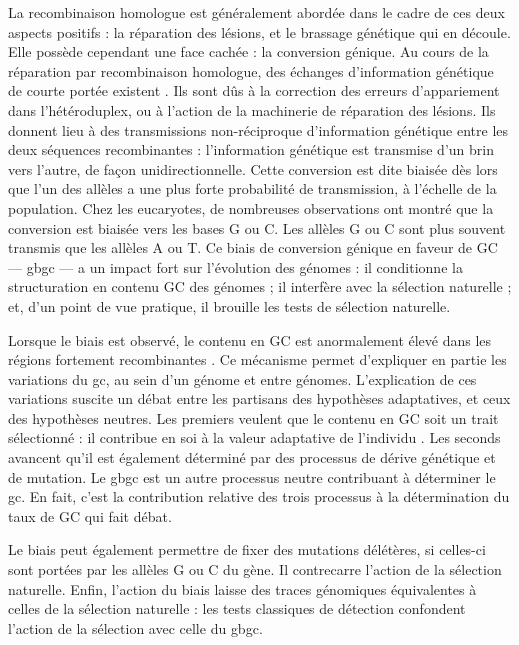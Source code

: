 \documentclass[11pt, oneside]{scrartcl}
\begin{document}
La recombinaison homologue est généralement abordée dans le cadre de ces deux
aspects positifs : la réparation des lésions, et le brassage génétique qui en
découle. Elle possède cependant une face cachée : la conversion génique. Au
cours de la réparation par recombinaison homologue, des échanges d'information
génétique de courte portée existent \cite{duret_biased_2009}. Ils sont dûs à la
correction des erreurs d'appariement dans l'hétéroduplex, ou à l'action de la
machinerie de réparation des lésions. Ils donnent lieu à des transmissions
non-réciproque d'information génétique entre les deux séquences recombinantes :
l'information génétique est transmise d'un brin vers l'autre, de façon
unidirectionnelle. Cette conversion est dite biaisée dès lors que l'un des
allèles a une plus forte probabilité de transmission, à l'échelle de la
population. Chez les eucaryotes, de nombreuses observations ont montré que la
conversion est biaisée vers les bases G ou
C\cite{pessia_evidence_2012,mancera_high-resolution_2008,duret_impact_2008}. Les
allèles G ou C sont plus souvent transmis que les allèles A ou T. Ce biais de
conversion génique en faveur de GC --- \ac{gbgc} --- a un impact fort sur
l'évolution des génomes : il conditionne la structuration en contenu GC des
génomes\cite{duret_impact_2008} ; il interfère avec la sélection
naturelle\cite{galtier_gc-biased_2009} ; et, d'un point de vue pratique, il
brouille les tests de sélection naturelle\cite{ratnakumar_detecting_2010}.

Lorsque le biais est observé, le contenu en GC est anormalement élevé dans les
régions fortement recombinantes \cite{duret_impact_2008}. Ce mécanisme permet
d'expliquer en partie les variations du \ac{gc}, au sein d'un génome et entre
génomes. L'explication de ces variations suscite un débat entre les partisans
des hypothèses adaptatives, et ceux des hypothèses neutres. Les premiers veulent
que le contenu en GC soit un trait sélectionné : il contribue en soi à la valeur
adaptative de l'individu \cite{hildebrand_evidence_2010}. Les seconds avancent
qu'il est également déterminé par des processus de dérive génétique et de
mutation. Le \ac{gbgc} est un autre processus neutre contribuant à déterminer le
\ac{gc}. En fait, c'est la contribution relative des trois processus à la
détermination du taux de GC qui fait débat.

Le biais peut également permettre de fixer des mutations délétères, si celles-ci
sont portées par les allèles G ou C du gène. Il contrecarre l'action de la
sélection naturelle\cite{galtier_gc-biased_2009, galtier_adaptation_2007}.
Enfin, l'action du biais laisse des traces génomiques équivalentes à celles de
la sélection naturelle : les tests classiques de détection confondent l'action
de la sélection avec celle du \ac{gbgc}\cite{ratnakumar_detecting_2010}.
\end{document}
